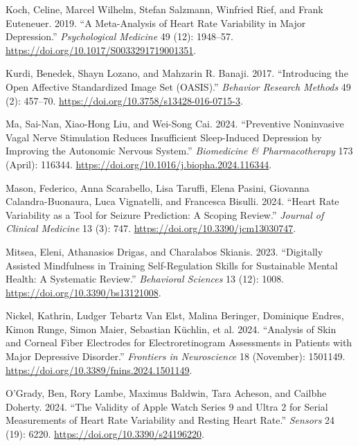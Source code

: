 \documentclass[
  Letterpaper,
]{scrbook}
\newlength{\cslhangindent}
\newenvironment{CSLReferences}[2] %
 {\begin{list}{}{%
  \setlength{\itemindent}{0pt}
  \setlength{\leftmargin}{0pt}
  \setlength{\parsep}{0pt}
  \ifodd #1
   \setlength{\leftmargin}{\cslhangindent}
   \setlength{\itemindent}{-1\cslhangindent}
  \fi
  \setlength{\itemsep}{#2\baselineskip}}}
 {\end{list}}
\begin{document}
\begin{CSLReferences}{1}{0}
Koch, Celine, Marcel Wilhelm, Stefan Salzmann, Winfried Rief, and Frank
Euteneuer. 2019. {``A Meta-Analysis of Heart Rate Variability in Major
Depression.''} \emph{Psychological Medicine} 49 (12): 1948--57.
\url{https://doi.org/10.1017/S0033291719001351}.

Kurdi, Benedek, Shayn Lozano, and Mahzarin R. Banaji. 2017.
{``Introducing the {Open Affective Standardized Image Set} ({OASIS}).''}
\emph{Behavior Research Methods} 49 (2): 457--70.
\url{https://doi.org/10.3758/s13428-016-0715-3}.

Ma, Sai-Nan, Xiao-Hong Liu, and Wei-Song Cai. 2024. {``Preventive
Noninvasive Vagal Nerve Stimulation Reduces Insufficient Sleep-Induced
Depression by Improving the Autonomic Nervous System.''}
\emph{Biomedicine \& Pharmacotherapy} 173 (April): 116344.
\url{https://doi.org/10.1016/j.biopha.2024.116344}.

Mason, Federico, Anna Scarabello, Lisa Taruffi, Elena Pasini, Giovanna
Calandra-Buonaura, Luca Vignatelli, and Francesca Bisulli. 2024.
{``Heart {Rate Variability} as a {Tool} for {Seizure Prediction}: {A
Scoping Review}.''} \emph{Journal of Clinical Medicine} 13 (3): 747.
\url{https://doi.org/10.3390/jcm13030747}.

Mitsea, Eleni, Athanasios Drigas, and Charalabos Skianis. 2023.
{``Digitally {Assisted Mindfulness} in {Training Self-Regulation Skills}
for {Sustainable Mental Health}: {A Systematic Review}.''}
\emph{Behavioral Sciences} 13 (12): 1008.
\url{https://doi.org/10.3390/bs13121008}.

Nickel, Kathrin, Ludger Tebartz Van Elst, Malina Beringer, Dominique
Endres, Kimon Runge, Simon Maier, Sebastian Küchlin, et al. 2024.
{``Analysis of Skin and Corneal Fiber Electrodes for Electroretinogram
Assessments in Patients with Major Depressive Disorder.''}
\emph{Frontiers in Neuroscience} 18 (November): 1501149.
\url{https://doi.org/10.3389/fnins.2024.1501149}.

O'Grady, Ben, Rory Lambe, Maximus Baldwin, Tara Acheson, and Cailbhe
Doherty. 2024. {``The {Validity} of {Apple Watch Series} 9 and {Ultra} 2
for {Serial Measurements} of {Heart Rate Variability} and {Resting Heart
Rate}.''} \emph{Sensors} 24 (19): 6220.
\url{https://doi.org/10.3390/s24196220}.


\end{CSLReferences}
\end{document}
